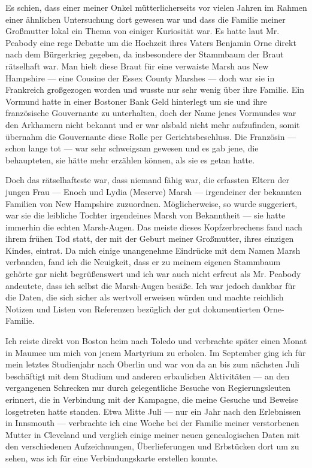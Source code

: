 Es schien, dass einer meiner Onkel mütterlicherseits vor vielen Jahren im Rahmen einer ähnlichen Untersuchung dort gewesen war und dass die Familie meiner Großmutter lokal ein Thema von einiger Kuriosität war. Es hatte laut Mr. Peabody eine rege Debatte um die Hochzeit ihres Vaters Benjamin Orne direkt nach dem Bürgerkrieg gegeben, da insbesondere der Stammbaum der Braut rätselhaft war. Man hielt diese Braut für eine verwaiste Marsh aus New Hampshire --- eine Cousine der Essex County Marshes --- doch war sie in Frankreich großgezogen worden und wusste nur sehr wenig über ihre Familie. Ein Vormund hatte in einer Bostoner Bank Geld hinterlegt um sie und ihre französische Gouvernante zu unterhalten, doch der Name jenes Vormundes war den Arkhamern nicht bekannt und er war alsbald nicht mehr aufzufinden, somit übernahm die Gouvernante diese Rolle per Gerichtsbeschluss. Die Französin --- schon lange tot --- war sehr schweigsam gewesen und es gab jene, die behaupteten, sie hätte mehr erzählen können, als sie es getan hatte.

Doch das rätselhafteste war, dass niemand fähig war, die erfassten Eltern der jungen Frau --- Enoch und Lydia (Meserve) Marsh --- irgendeiner der bekannten Familien von New Hampshire zuzuordnen. Möglicherweise, so wurde suggeriert, war sie die leibliche Tochter irgendeines Marsh von Bekanntheit --- sie hatte immerhin die echten Marsh-Augen. Das meiste dieses Kopfzerbrechens fand nach ihrem frühen Tod statt, der mit der Geburt meiner Großmutter, ihres einzigen Kindes, eintrat. Da mich einige unangenehme Eindrücke mit dem Namen Marsh verbanden, fand ich die Neuigkeit, dass er zu meinem eigenen Stammbaum gehörte gar nicht begrüßenswert und ich war auch nicht erfreut als Mr. Peabody andeutete, dass ich selbst die Marsh-Augen besäße. Ich war jedoch dankbar für die Daten, die sich sicher als wertvoll erweisen würden und machte reichlich Notizen und Listen von Referenzen bezüglich der gut dokumentierten Orne-Familie.

Ich reiste direkt von Boston heim nach Toledo und verbrachte später einen Monat in Maumee um mich von jenem Martyrium zu erholen. Im September ging ich für mein letztes Studienjahr nach Oberlin und war von da an bis zum nächsten Juli beschäftigt mit dem Studium und anderen erbaulichen Aktivitäten --- an den vergangenen Schrecken nur durch gelegentliche Besuche von Regierungsleuten erinnert, die in Verbindung mit der Kampagne, die meine Gesuche und Beweise losgetreten hatte standen. Etwa Mitte Juli --- nur ein Jahr nach den Erlebnissen in Innsmouth --- verbrachte ich eine Woche bei der Familie meiner verstorbenen Mutter in Cleveland und verglich einige meiner neuen genealogischen Daten mit den verschiedenen Aufzeichnungen, Überlieferungen und Erbstücken dort um zu sehen, was ich für eine Verbindungskarte erstellen konnte.

